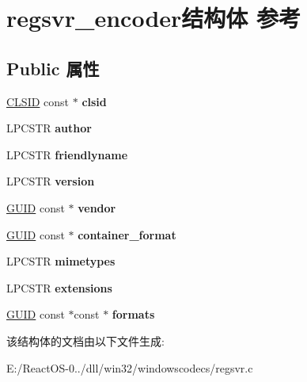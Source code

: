 \hypertarget{structregsvr__encoder}{}\section{regsvr\+\_\+encoder结构体 参考}
\label{structregsvr__encoder}
\subsection*{Public 属性}
\begin{DoxyCompactItemize}
\item 
\mbox{\label{structregsvr__encoder_a82cd23daaaef2c4c1c30d622819e1df5}} 
\hyperlink{struct___i_i_d}{C\+L\+S\+ID} const  $\ast$ {\bfseries clsid}
\item 
\mbox{\label{structregsvr__encoder_a676555832832e5ac18582d18644ef94e}} 
L\+P\+C\+S\+TR {\bfseries author}
\item 
\mbox{\label{structregsvr__encoder_aab944951b8660ea0083c51fbfb1a6969}} 
L\+P\+C\+S\+TR {\bfseries friendlyname}
\item 
\mbox{\label{structregsvr__encoder_a94ccda74a25043ea4ed969cd643f6028}} 
L\+P\+C\+S\+TR {\bfseries version}
\item 
\mbox{\label{structregsvr__encoder_ac28028bfa4cac121f1c39122d637c03b}} 
\hyperlink{interface_g_u_i_d}{G\+U\+ID} const  $\ast$ {\bfseries vendor}
\item 
\mbox{\label{structregsvr__encoder_a768f7b9f6da9334000cba0c370aa36d6}} 
\hyperlink{interface_g_u_i_d}{G\+U\+ID} const  $\ast$ {\bfseries container\+\_\+format}
\item 
\mbox{\label{structregsvr__encoder_add7d61ddc0e50dc6d1fb7bd1e7333318}} 
L\+P\+C\+S\+TR {\bfseries mimetypes}
\item 
\mbox{\label{structregsvr__encoder_ae3772c3f04065d3a0813a82da42b92b2}} 
L\+P\+C\+S\+TR {\bfseries extensions}
\item 
\mbox{\label{structregsvr__encoder_a3803ba9d81e13c4a0aee07b39db3b9a1}} 
\hyperlink{interface_g_u_i_d}{G\+U\+ID} const  $\ast$const  $\ast$ {\bfseries formats}
\end{DoxyCompactItemize}


该结构体的文档由以下文件生成\+:\begin{DoxyCompactItemize}
\item 
E\+:/\+React\+O\+S-\/0../dll/win32/windowscodecs/regsvr.\+c\end{DoxyCompactItemize}
